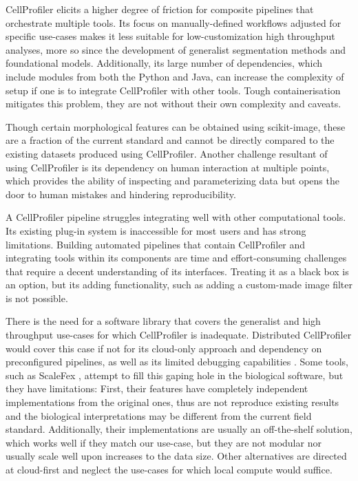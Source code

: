 \documentclass{article}
\begin{document}
CellProfiler elicits a higher degree of friction for composite pipelines that orchestrate multiple tools. Its focus on manually-defined workflows adjusted for specific use-cases makes it less suitable for low-customization high throughput analyses, more so since the development of generalist segmentation methods and foundational models. Additionally, its large number of dependencies, which include modules from both the Python and Java, can increase the complexity of setup if one is to integrate CellProfiler with other tools. Tough containerisation mitigates this problem, they are not without their own complexity and caveats.

Though certain morphological features can be obtained using scikit-image, these are a fraction of the current standard and cannot be directly compared to the existing datasets produced using CellProfiler. Another challenge resultant of using CellProfiler is its dependency on human interaction at multiple points, which provides the ability of inspecting and parameterizing data but opens the door to human mistakes and hindering reproducibility.

A CellProfiler pipeline struggles integrating well with other computational tools. Its existing plug-in system is inaccessible for most users and has strong limitations. Building automated pipelines that contain CellProfiler and integrating tools within its components are time and effort-consuming challenges that require a decent understanding of its interfaces. Treating it as a black box is an option, but its adding functionality, such as adding a custom-made image filter is not possible.

There is the need for a software library that covers the generalist and high throughput use-cases for which CellProfiler is inadequate. Distributed CellProfiler would cover this case if not for its cloud-only approach and dependency on preconfigured pipelines, as well as its limited debugging capabilities \citep{mcquinCellProfiler30Nextgeneration2018}. Some tools, such as ScaleFex \citep{comoletHighlyEfficientScalable2024}, attempt to fill this gaping hole in the biological software, but they have limitations: First, their features have completely independent implementations from the original ones, thus are not reproduce existing results and the biological interpretations may be different from the current field standard. Additionally, their implementations are usually an off-the-shelf solution, which works well if they match our use-case, but they are not modular nor usually scale well upon increases to the data size. Other alternatives are directed at cloud-first and neglect the use-cases for which local compute would suffice.
\end{document}

